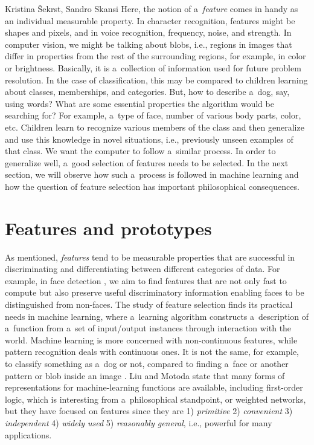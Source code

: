\begin{artengenv2auth}{Kristina Šekrst, Sandro Skansi}
Here, the notion of a~\textit{feature} comes in handy as an individual measurable property. In character recognition, features might be shapes and pixels, and in voice recognition, frequency, noise, and strength. In computer vision, we might be talking about blobs, i.e., regions in images that differ in properties from the rest of the surrounding regions, for example, in color or brightness. Basically, it is a~collection of information used for future problem resolution. In the case of classification, this may be compared to children learning about classes, memberships, and categories. But, how to describe a~dog, say, using words? What are some essential properties the algorithm would be searching for? For example, a~type of face, number of various body parts, color, etc. Children learn to recognize various members of the class and then generalize and use this knowledge in novel situations, i.e., previously unseen examples of that class. We want the computer to follow a~similar process. In order to generalize well, a~good selection of features needs to be selected. In the next section, we will observe how such a~process is followed in machine learning and how the question of feature selection has important philosophical consequences.

\section*{Features and prototypes}
As mentioned, \textit{features} tend to be measurable properties that are successful in discriminating and differentiating between different categories of data. For example, in face detection
\parencite[][p.3]{bishop_pattern_2006}, %
 we aim to find features that are not only fast to compute but also preserve useful discriminatory information enabling faces to be distinguished from non-faces. The study of feature selection finds its practical needs in machine learning, where a~learning algorithm constructs a~description of a~function from a~set of input/output instances through interaction with the world. Machine learning is more concerned with non-continuous features, while pattern recognition deals with continuous ones. It is not the same, for example, to classify something as a~dog or not, compared to finding a~face or another pattern or blob inside an image 
\parencite[][p.2]{liu_feature_1998}. %
 Liu and Motoda 
\parencite*[][p.2]{liu_feature_1998} %
 state that many forms of representations for machine-learning functions are available, including first-order logic, which is interesting from a~philosophical standpoint, or weighted networks, but they have focused on features since they are 1) \textit{primitive} 2) \textit{convenient} 3) \textit{independent} 4) \textit{widely used} 5) \textit{reasonably general}, i.e., powerful for many applications.


\end{artengenv2auth}
